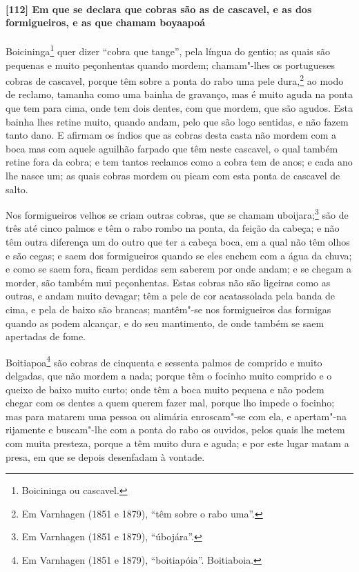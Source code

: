\begin{linenumbers}
\paragraph{[112] Em que se declara que cobras são as de cascavel, e as dos formigueiros, e
as que chamam boyaapoá}\quad
Boicininga\footnote{ Boicininga ou cascavel.} quer dizer ``cobra que tange'', pela língua
do gentio; as quais são pequenas e muito peçonhentas quando mordem; chamam"-lhes os
portugueses cobras de cascavel, porque têm sobre a ponta do rabo uma pele dura,\footnote{
Em Varnhagen (1851 e 1879), ``têm sobre o rabo uma''.} ao modo de reclamo, tamanha como
uma bainha de gravanço, mas é muito aguda na ponta que tem para cima, onde tem dois
dentes, com que mordem, que são agudos. Esta bainha lhes retine muito, quando andam, pelo
que são logo sentidas, e não fazem tanto dano. E afirmam os índios que as cobras desta
casta não mordem com a boca mas com aquele aguilhão farpado que têm neste cascavel, o qual
também retine fora da cobra; e tem tantos reclamos como a cobra tem de anos; e cada ano
lhe nasce um; as quais cobras mordem ou picam com esta ponta de cascavel de salto.

Nos formigueiros velhos se criam outras cobras, que se chamam uboijara;\footnote{ Em
Varnhagen (1851 e 1879), ``úbojára''.} são de três até cinco palmos e têm o rabo rombo na
ponta, da feição da cabeça; e não têm outra diferença um do outro que ter a cabeça boca,
em a qual não têm olhos e são cegas; e saem dos formigueiros quando se eles enchem com a
água da chuva; e como se saem fora, ficam perdidas sem saberem por onde andam; e se chegam
a morder, são também mui peçonhentas. Estas cobras não são ligeiras como as outras, e
andam muito devagar; têm a pele de cor acatassolada pela banda de cima, e pela de baixo
são brancas; mantêm"-se nos formigueiros das formigas quando as podem alcançar, e do seu
mantimento, de onde também se saem apertadas de fome.

Boitiapoa\footnote{ Em Varnhagen (1851 e 1879), ``boitiapóia''. Boitiaboia.} são cobras de
cinquenta e sessenta palmos de comprido e muito delgadas, que não mordem a nada; porque
têm o focinho muito comprido e o queixo de baixo muito curto; onde têm a boca muito
pequena e não podem chegar com os dentes a quem querem fazer mal, porque lho impede o
focinho; mas para matarem uma pessoa ou alimária enroscam"-se com ela, e apertam"-na
rijamente e buscam"-lhe com a ponta do rabo os ouvidos, pelos quais lhe metem com muita
presteza, porque a têm muito dura e aguda; e por este lugar matam a presa, em que se
depois desenfadam à vontade.


\end{linenumbers}

